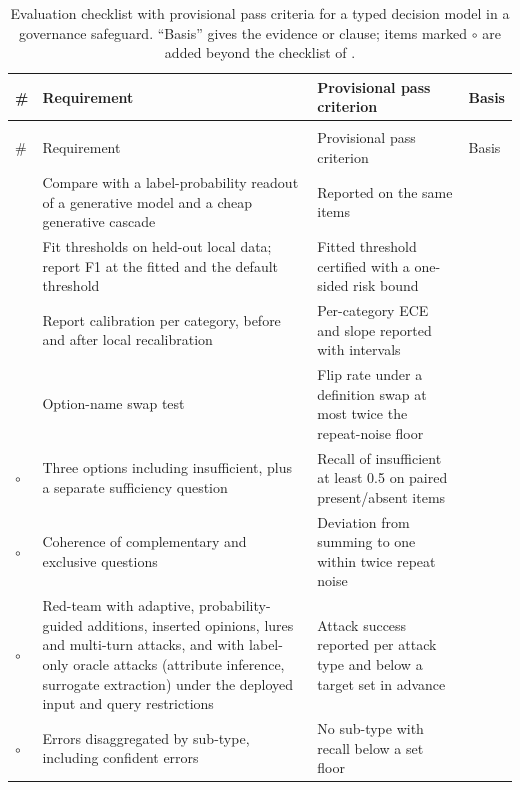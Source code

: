 \begin{longtable}{@{}>{\rg}p{0.05\dw}>{\rg}p{0.34\dw}>{\rg}p{0.38\dw}>{\rg}p{0.23\dw}@{}}
\caption{Evaluation checklist with provisional pass criteria for a typed decision model in a governance safeguard. ``Basis'' gives the evidence or clause; items marked $\circ$ are added beyond the checklist of \protect\cite{arx32160}.}\label{tab:D2}\\
\toprule
\# & Requirement & Provisional pass criterion & Basis\\
\midrule
\endfirsthead
\multicolumn{4}{@{}l}{\textit{Table~\ref{tab:D2}, continued.}}\\
\toprule
\# & Requirement & Provisional pass criterion & Basis\\
\midrule
\endhead
\bottomrule
\endfoot
\bottomrule
\endlastfoot
1 & Compare with a label-probability readout of a generative model and a cheap generative cascade & Reported on the same items & \cite{arx32160}\\
2 & Fit thresholds on held-out local data; report F1 at the fitted and the default threshold & Fitted threshold certified with a one-sided risk bound & \cite{arx29429,arx00346}\\
3 & Report calibration per category, before and after local recalibration & Per-category ECE and slope reported with intervals & \cite{arx24052,arx27607}\\
4 & Option-name swap test & Flip rate under a definition swap at most twice the repeat-noise floor & \cite{arx26758,arx00346}\\
5$\circ$ & Three options including insufficient, plus a separate sufficiency question & Recall of insufficient at least 0.5 on paired present/absent items & \cite{arx01006,arx39496,polgov}\\
6$\circ$ & Coherence of complementary and exclusive questions & Deviation from summing to one within twice repeat noise & \cite{arx33209}\\
7$\circ$ & Red-team with adaptive, probability-guided additions, inserted opinions, lures and multi-turn attacks, and with label-only oracle attacks (attribute inference, surrogate extraction) under the deployed input and query restrictions & Attack success reported per attack type and below a target set in advance & \cite{arx01834,arx04985,arx30243,arx31142,checkpoint2026jev}\\
8$\circ$ & Errors disaggregated by sub-type, including confident errors & No sub-type with recall below a set floor & \cite{arx33401}\\

\end{longtable}
